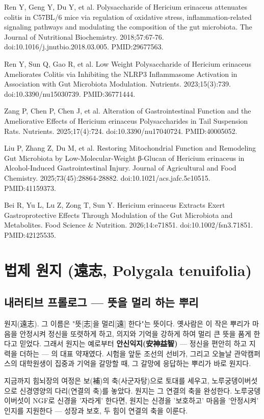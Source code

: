 \documentclass[11pt,oneside]{book}
\newcommand{\refend}{\endgroup\par}
\newcommand{\reff}[2]{\par\hangindent=7mm\hangafter=1\noindent[#1]\hspace{2mm}#2\par}
\begin{document}
\reff{62}{Ren Y, Geng Y, Du Y, et al. Polysaccharide of Hericium erinaceus attenuates colitis in C57BL/6 mice via regulation of oxidative stress, inflammation-related signaling pathways and modulating the composition of the gut microbiota. The Journal of Nutritional Biochemistry. 2018;57:67-76. doi:10.1016/j.jnutbio.2018.03.005. PMID:29677563.}
\reff{63}{Ren Y, Sun Q, Gao R, et al. Low Weight Polysaccharide of Hericium erinaceus Ameliorates Colitis via Inhibiting the NLRP3 Inflammasome Activation in Association with Gut Microbiota Modulation. Nutrients. 2023;15(3):739. doi:10.3390/nu15030739. PMID:36771444.}
\reff{64}{Zang P, Chen P, Chen J, et al. Alteration of Gastrointestinal Function and the Ameliorative Effects of Hericium erinaceus Polysaccharides in Tail Suspension Rats. Nutrients. 2025;17(4):724. doi:10.3390/nu17040724. PMID:40005052.}
\reff{65}{Liu P, Zhang Z, Du M, et al. Restoring Mitochondrial Function and Remodeling Gut Microbiota by Low-Molecular-Weight β-Glucan of Hericium erinaceus in Alcohol-Induced Gastrointestinal Injury. Journal of Agricultural and Food Chemistry. 2025;73(45):28864-28882. doi:10.1021/acs.jafc.5c10515. PMID:41159373.}
\reff{66}{Bei R, Yu L, Lu Z, Zong T, Sun Y. Hericium erinaceus Extracts Exert Gastroprotective Effects Through Modulation of the Gut Microbiota and Metabolites. Food Science \& Nutrition. 2026;14:e71851. doi:10.1002/fsn3.71851. PMID:42125535.}
\refend


\chapter{법제 원지 (遠志, Polygala tenuifolia)}

\section{내러티브 프롤로그 — 뜻을 멀리 하는 뿌리}
원지(遠志). 그 이름은 "뜻[志]을 멀리[遠] 한다"는 뜻이다. 옛사람은 이 작은 뿌리가 마음을 안정시켜 정신을 또렷하게 하고, 의지와 기억을 강하게 하여 멀리 큰 뜻을 품게 한다고 믿었다. 그래서 원지는 예로부터 \textbf{안신익지(安神益智)} — 정신을 편안히 하고 지력을 더하는 — 의 대표 약재였다. 시험을 앞둔 조선의 선비가, 그리고 오늘날 관악캠퍼스의 대학원생이 집중과 기억을 갈망할 때, 그 갈망에 응답하는 뿌리가 바로 원지다.

지금까지 힘뇌장의 여정은 보(補)의 축(사군자탕)으로 토대를 세우고, 노루궁뎅이버섯으로 신경영양의 다리(연결의 축)를 놓았다. 원지는 그 연결의 축을 완성한다. 노루궁뎅이버섯이 NGF로 신경을 '자라게' 한다면, 원지는 신경을 '보호하고' 마음을 '안정시켜' 인지를 지원한다 — 성장과 보호, 두 힘이 연결의 축을 이룬다.
\end{document}
